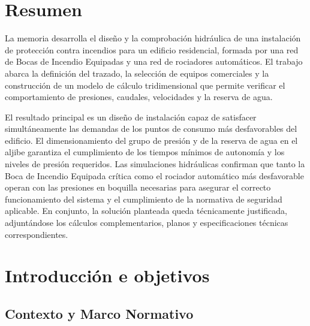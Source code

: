 \documentclass[12pt,a4paper]{article}
\begin{document}
\clearpage
\pagestyle{empty}

{
	\hypersetup{linkcolor=black}
	\tableofcontents
	\clearpage

	{
		\let\oldnumberline\numberline
		\renewcommand{\numberline}{\figurename~\oldnumberline}
		\listoffigures
	}
	\clearpage

}

\pagestyle{contenido}
\section*{Resumen}
{}

La memoria desarrolla el diseño y la comprobación hidráulica de una instalación de protección contra incendios para un edificio residencial, formada por una red de Bocas de Incendio Equipadas y una red de rociadores automáticos. El trabajo abarca la definición del trazado, la selección de equipos comerciales y la construcción de un modelo de cálculo tridimensional que permite verificar el comportamiento de presiones, caudales, velocidades y la reserva de agua.

El resultado principal es un diseño de instalación capaz de satisfacer simultáneamente las demandas de los puntos de consumo más desfavorables del edificio. El dimensionamiento del grupo de presión y de la reserva de agua en el aljibe garantiza el cumplimiento de los tiempos mínimos de autonomía y los niveles de presión requeridos. Las simulaciones hidráulicas confirman que tanto la Boca de Incendio Equipada crítica como el rociador automático más desfavorable operan con las presiones en boquilla necesarias para asegurar el correcto funcionamiento del sistema y el cumplimiento de la normativa de seguridad aplicable. En conjunto, la solución planteada queda técnicamente justificada, adjuntándose los cálculos complementarios, planos y especificaciones técnicas correspondientes.

\section{Introducción e objetivos}

\subsection{Contexto y Marco Normativo}
\end{document}
